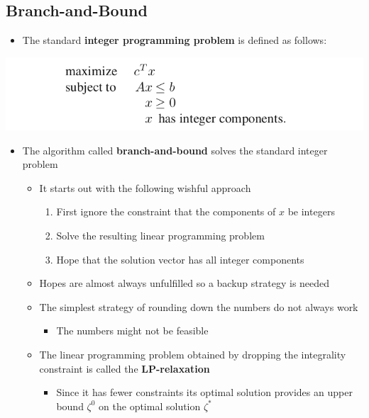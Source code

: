 \documentclass[11pt]{article}
\begin{document}
\subsection{Branch-and-Bound}
\label{sec:org3cdc8f7}
\begin{itemize}
\item The standard \textbf{integer programming problem} is defined as follows:
\end{itemize}
\begin{center}
\includegraphics[width=.9\linewidth]{Integer Programming/screenshot_2019-02-17_10-35-32.png}
\end{center}

\begin{itemize}
\item The algorithm called \textbf{branch-and-bound} solves the standard integer problem
\begin{itemize}
\item It starts out with the following wishful approach
\begin{enumerate}
\item First ignore the constraint that the components of \(x\) be integers
\item Solve the resulting linear programming problem
\item Hope that the solution vector has all integer components
\end{enumerate}
\item Hopes are almost always unfulfilled so a backup strategy is needed
\item The simplest strategy of rounding down the numbers do not always work
\begin{itemize}
\item The numbers might not be feasible
\end{itemize}
\item The linear programming problem obtained by dropping the integrality constraint is called the \textbf{LP-relaxation}
\begin{itemize}
\item Since it has fewer constraints its optimal solution provides an upper bound \(\zeta^0\) on the optimal solution \(\zeta^*\)
\end{itemize}
\end{itemize}
\end{itemize}
\end{document}
